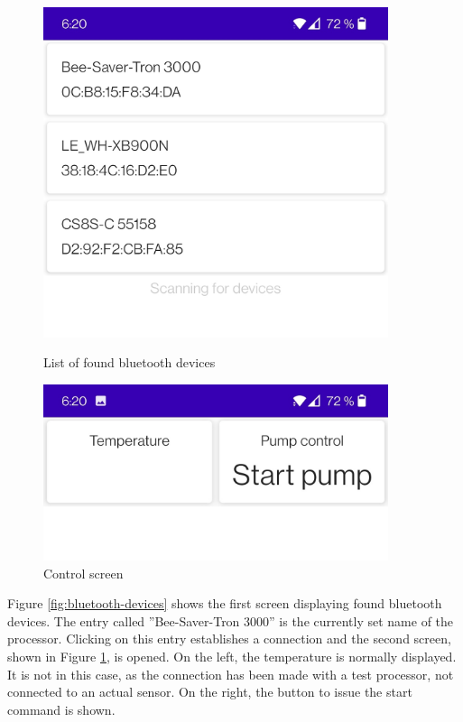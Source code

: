 \begin{figure}[h]
    \centering
    \begin{minipage}{0.5\textwidth}
        \centering
        \includegraphics[width=0.9\textwidth]{img/bluetooth-list}
        \caption{List of found bluetooth devices}
        \label{fig:bluetooth-devices}
    \end{minipage}\hfill
    \begin{minipage}{0.5\textwidth}
        \centering
        \includegraphics[width=0.9\textwidth]{img/control}
        \caption{Control screen}
        \label{fig:control-screen}
    \end{minipage}
\end{figure}

\newpage

Figure \ref{fig:bluetooth-devices} shows the first screen displaying found bluetooth devices.
The entry called ''Bee-Saver-Tron 3000'' is the currently set name of the processor.
Clicking on this entry establishes a connection and the second screen, shown in Figure \ref{fig:control-screen}, is opened.
On the left, the temperature is normally displayed.
It is not in this case, as the connection has been made with a test processor, not connected to an actual sensor.
On the right, the button to issue the start command is shown.

